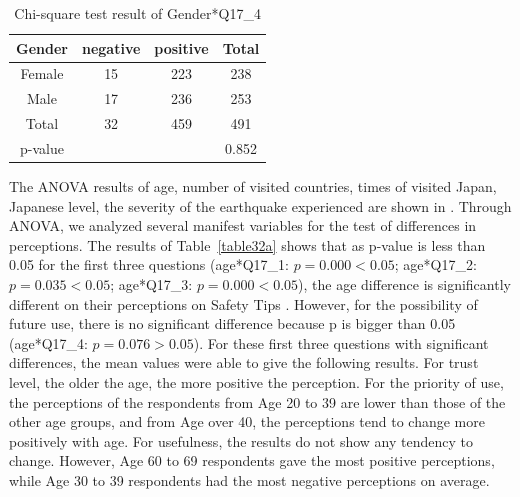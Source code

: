 \begin{table}[h]
  \vspace{-0.2cm}
  \caption{Chi-square test result of Gender*Q17\_4 }
  \label{table31d}
  \centering
\begin{tabular}{cccc}
\hline
Gender & negative & positive & Total \\
\hline
Female & 15                           & 223                          & 238                       \\
Male   & 17                         & 236                      & 253                       \\
Total  & 32                           & 459                          & 491                       \\
\hline
p-value      &        &      & 0.852   \\
\hline                   
\end{tabular}
\end{table}

\cleardoublepage

The ANOVA results of age, number of visited countries, times of visited Japan, Japanese level, the severity of the earthquake experienced are shown in . Through ANOVA, we analyzed several manifest variables for the test of differences in perceptions. The results of Table~\ref{table32a} shows that as p-value is less than 0.05 for the first three questions (age*Q17\_1: $p=0.000<0.05$; age*Q17\_2: $p=0.035<0.05$; age*Q17\_3: $p=0.000<0.05$), the age difference is significantly different on their perceptions on Safety Tips . However, for the possibility of future use, there is no significant difference because p is bigger than 0.05 (age*Q17\_4: $p=0.076>0.05$). For these first three questions with significant differences, the mean values were able to give the following results. For trust level, the older the age, the more positive the perception. For the priority of use, the perceptions of the respondents from Age 20 to 39 are lower than those of the other age groups, and from Age over 40, the perceptions tend to change more positively with age. For usefulness, the results do not show any tendency to change. However, Age 60 to 69 respondents gave the most positive perceptions, while Age 30 to 39 respondents had the most negative perceptions on average. 

